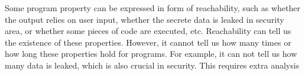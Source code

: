  
Some program property can be expressed in form of reachability,
such as
whether the output relies on user input, whether the secrete data is leaked in security area, 
or whether some pieces of code are executed, etc.
Reachability can tell us the existence of these properties.
However, it cannot tell us how many times or how long these properties hold for programs.
For example, it can not tell us how many data is leaked, which is also crucial in security. This requires extra analysis

